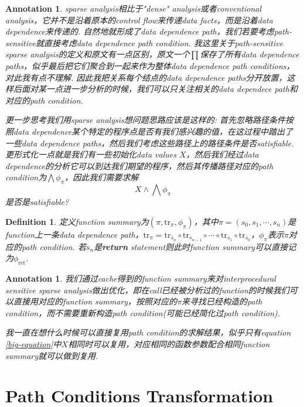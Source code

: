 \documentclass{article}
\newtheorem{definition}[theorem]{Definition}
\newtheorem{annotation}[theorem]{Annotation}
\begin{document}
\begin{annotation}
\rm sparse analysis相比于"dense" analysis或者conventional analysis，它并不是沿着原本的control flow来传递data facts，而是沿着data dependence来传递的. 自然地就形成了data dependence path，我们若要考虑path-sensitive就直接考虑data dependence path condition.  我这里关于path-sensitive sparse analysis的定义和原文有一点区别，原文一个$\prod$保存了所有data dependence paths，似乎最后把它们聚合到一起来作为整体data dependence path conditions，对此我有点不理解. 因此我把关系每个结点的data dependence paths分开放置，这样后面对某一点进一步分析的时候，我们可以只关注相关的data dependece path和对应的path condition. 


更一步思考我们用sparse analysis想问题思路应该是这样的: 首先忽略路径条件按照data dependence某个特定的程序点是否有我们感兴趣的值，在这过程中踏出了一些data dependence paths，然后我们考虑这些路径上的路径条件是否satisfiable. 更形式化一点就是我们有一些初始化data values $X$，然后我们经过data dependence的分析它可以到达我们期望的程序，然后其传播路径对应的path condition为$\bigwedge \phi_\pi$，因此我们需要求解
\begin{equation}\label{big-equation}
X \wedge \bigwedge \phi_\pi
\end{equation}
是否是satisfiable?
\end{annotation}

\begin{definition}
\rm 定义function summary为$(\pi, \text{tr}_\pi,\phi_\pi)$，其中$\pi=(s_0,s_1,\cdots,s_n)$是function上一条data dependence path，$\text{tr}_\pi = \text{tr}_{s_n} \circ \text{tr}_{s_{n-1}} \circ \cdots \circ \text{tr}_{s_1} \circ \text{tr}_{s_0}$，$\phi_\pi$表示$\pi$对应的path condition. 若$s_n$是\textbf{return} statement则此时function summary可以直接记为$\phi_{\text{ret}}$. 
\end{definition}

\begin{annotation}
\rm 我们通过cache得到的function summary来对interprocedural sensitive sparse analysis做出优化，即在call已经被分析过的function的时候我们可以直接用对应的function summary，按照对应的$\pi$来寻找已经构造的path condition，而不需要重新构造path condition(可能已经简化过path condition).

我一直在想什么时候可以直接复用path condition的求解结果，似乎只有equation \ref{big-equation}中$X$相同时可以复用，对应相同的函数参数配合相同function summary就可以做到复用. 
\end{annotation}

\newpage
\section{Path Conditions Transformation}
\end{document}
